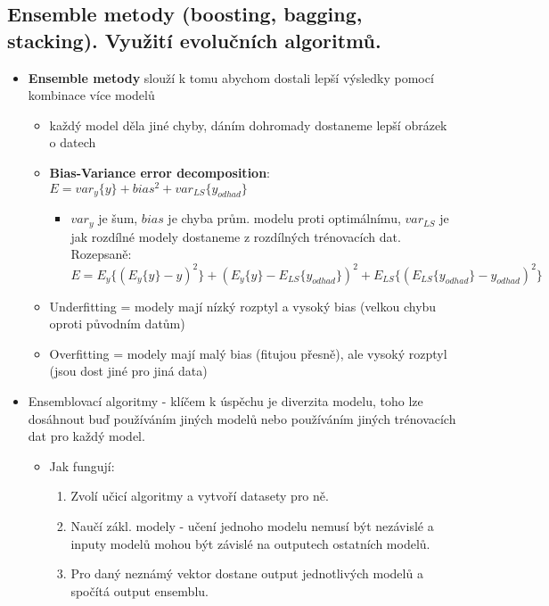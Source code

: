 \documentclass[a4paper,hidelinks]{article}
\begin{document}
\subsection{Ensemble metody (boosting, bagging, stacking). Využití evolučních algoritmů.}
\begin{itemize}
    \item \textbf{Ensemble metody} slouží k tomu abychom dostali lepší výsledky pomocí kombinace více modelů
        \begin{itemize}
            \item každý model děla jiné chyby, dáním dohromady dostaneme lepší obrázek o datech
            \item \textbf{Bias-Variance error decomposition}: $E=var_y\{y\}+bias^2+var_{LS}\{y_{odhad}\}$
                \begin{itemize}
                    \item $var_y$ je šum, $bias$ je chyba prům. modelu proti optimálnímu, $var_{LS}$ je jak rozdílné modely dostaneme z rozdílných trénovacích dat.
                    Rozepsaně: $E=E_y\{(E_y\{y\}-y)^2\}+(E_y\{y\}-E_{LS}\{y_{odhad}\})^2+E_{LS}\{(E_{LS}\{y_{odhad}\}-y_{odhad})^2\}$
                \end{itemize}
            \item Underfitting = modely mají nízký rozptyl a vysoký bias (velkou chybu oproti původním datům)
            \item Overfitting = modely mají malý bias (fitujou přesně), ale vysoký rozptyl (jsou dost jiné pro jiná data)
        \end{itemize}
    \item Ensemblovací algoritmy - klíčem k úspěchu je diverzita modelu, toho lze dosáhnout buď používáním jiných modelů nebo používáním jiných trénovacích dat pro každý model.
        \begin{itemize}
            \item Jak fungují: 
                \begin{enumerate}
                    \item Zvolí učicí algoritmy a vytvoří datasety pro ně.
                    \item Naučí zákl. modely - učení jednoho modelu nemusí být nezávislé a inputy modelů mohou být závislé na outputech ostatních modelů.
                    \item Pro daný neznámý vektor dostane output jednotlivých modelů a spočítá output ensemblu.
                \end{enumerate}

\end{itemize}
\end{itemize}
\end{document}
